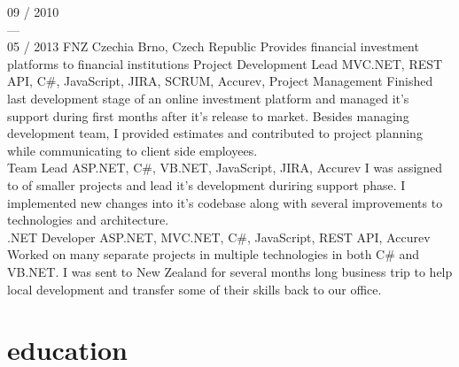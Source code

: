 \documentclass[]{friggeri-cv} %
\begin{document}
\begin{entrylist}
  \job
  {09 / 2010 \\ --- \\ 05 / 2013}
  {FNZ Czechia}
  {Brno, Czech Republic}
  {Provides financial investment platforms to financial institutions}
  {
    \position
    {Project Development Lead}
    {MVC.NET, REST API, C\#, JavaScript, JIRA, SCRUM, Accurev, Project Management}
    {Finished last development stage of an online investment platform and managed it's support during first months after it's
    release to market. Besides managing development team, I provided estimates and contributed to project planning
    while communicating to client side employees.}\\
    \position
    {Team Lead}
    {ASP.NET, C\#, VB.NET, JavaScript, JIRA, Accurev}
    {I was assigned to of smaller projects and lead it's development duriring support phase. I implemented new changes
    into it's codebase along with several improvements to technologies and architecture.}\\
    \position
    {.NET Developer}
    {ASP.NET, MVC.NET, C\#, JavaScript, REST API, Accurev}
    {Worked on many separate projects in multiple technologies in both C\# and VB.NET. I was sent to New Zealand for
    several months long business trip to help local development and transfer some of their skills back to our office.}%
  }
\end{entrylist}

\section{education}
\end{document}
